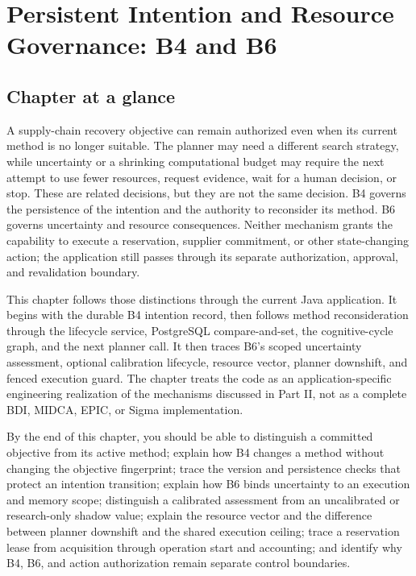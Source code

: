 \chapter{Persistent Intention and Resource Governance: B4 and B6}
\label{ch:persistent-intention-resource-governance}

\section*{Chapter at a glance}
{}

A supply-chain recovery objective can remain authorized even when its current method is no longer suitable. The planner may need a different search strategy, while uncertainty or a shrinking computational budget may require the next attempt to use fewer resources, request evidence, wait for a human decision, or stop. These are related decisions, but they are not the same decision. B4 governs the persistence of the intention and the authority to reconsider its method. B6 governs uncertainty and resource consequences. Neither mechanism grants the capability to execute a reservation, supplier commitment, or other state-changing action; the application still passes through its separate authorization, approval, and revalidation boundary.

This chapter follows those distinctions through the current Java application. It begins with the durable B4 intention record, then follows method reconsideration through the lifecycle service, PostgreSQL compare-and-set, the cognitive-cycle graph, and the next planner call. It then traces B6's scoped uncertainty assessment, optional calibration lifecycle, resource vector, planner downshift, and fenced execution guard. The chapter treats the code as an application-specific engineering realization of the mechanisms discussed in Part II, not as a complete BDI, MIDCA, EPIC, or Sigma implementation.

\begin{learningbox}
By the end of this chapter, you should be able to distinguish a committed objective from its active method; explain how B4 changes a method without changing the objective fingerprint; trace the version and persistence checks that protect an intention transition; explain how B6 binds uncertainty to an execution and memory scope; distinguish a calibrated assessment from an uncalibrated or research-only shadow value; explain the resource vector and the difference between planner downshift and the shared execution ceiling; trace a reservation lease from acquisition through operation start and accounting; and identify why B4, B6, and action authorization remain separate control boundaries.
\end{learningbox}

